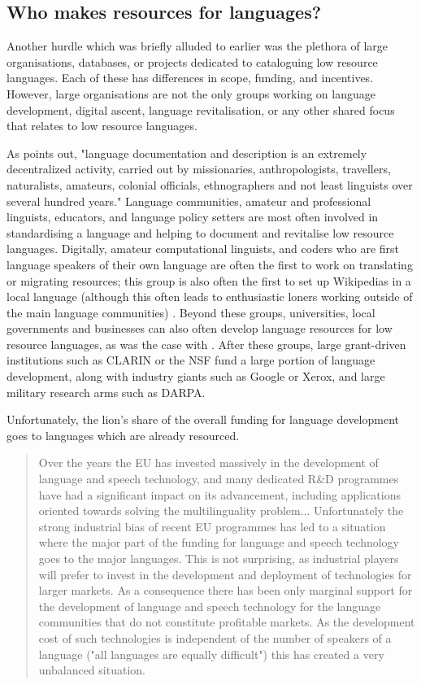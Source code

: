 \subsection{Who makes resources for languages?}
Another hurdle which was briefly alluded to earlier was the plethora of large organisations, databases, or projects dedicated to cataloguing low resource languages. Each of these has differences in scope, funding, and incentives. However, large organisations are not the only groups working on language development, digital ascent, language revitalisation, or any other shared focus that relates to low resource languages.

As \citet{hammarstrom2015unesco} points out, "language documentation and description is an extremely decentralized activity, carried out by missionaries, anthropologists, travellers, naturalists, amateurs, colonial officials, ethnographers and not least linguists over several hundred years." Language communities, amateur and professional linguists, educators, and language policy setters are most often involved in standardising a language and helping to document and revitalise low resource languages. Digitally, amateur computational linguists, and coders who are first language speakers of their own language are often the first to work on translating or migrating resources; this group is also often the first to set up Wikipedias in a local language (although this often leads to enthusiastic loners working outside of the main language communities) \citet{soria2017digital}. Beyond these groups, universities, local governments and businesses can also often develop language resources for low resource languages, as was the case with \citet{rognvaldsson2009icelandic}. After these groups, large grant-driven institutions such as CLARIN or the NSF fund a large portion of language development, along with industry giants such as Google or Xerox, and large military research arms such as DARPA.

Unfortunately, the lion's share of the overall funding for language development goes to languages which are already resourced.

\begin{quote}
Over the years the EU has invested massively in the development of language and speech technology, and many dedicated R\&D programmes have had a significant impact on its advancement, including applications oriented towards solving the multilinguality problem... Unfortunately the strong industrial bias of recent EU programmes has led to a situation where the major part of the funding for language and speech technology goes to the major languages. This is not surprising, as industrial players will prefer to invest in the development and deployment of technologies for larger markets. As a consequence there has been only marginal support for the development of language and speech technology for the language communities that do not constitute profitable markets. As the development cost of such technologies is independent of the number of speakers of a language ("all languages are equally difficult") this has created a very unbalanced situation. \citep{krauwer2006strengthening}
\end{quote}

